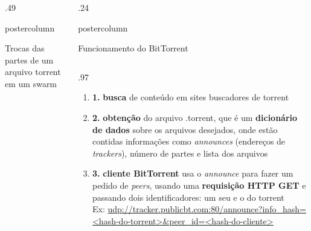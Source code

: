 \documentclass[final,brazil]{beamer}
\newenvironment{innercol}[3][.97\textwidth]{
\begin{columns}
  \hspace{#2}
  \begin{column}{#1}
    \vspace{#3}
    \justifying
}{
  \end{column}
\end{columns}
}
\newlength{\columnheight}
\begin{document}
\begin{frame}
\begin{columns}
\begin{column}{.49\textwidth}
\begin{beamercolorbox}[center,wd=\textwidth]{postercolumn}
\begin{minipage}[T]{.95\textwidth}
{\begin{block}{Trocas das partes de um arquivo torrent em um swarm}
\begin{innercol}[\textwidth]{-2ex}{0ex}
\begin{figure}[H]
\begin{subfigure}[H]{\myhsize}
                  \end{subfigure}%
                \end{figure}
              \end{innercol}
            \end{block}
          }
        \end{minipage}
      \end{beamercolorbox}
    \end{column}

    \begin{column}{.24\textwidth}
      \begin{beamercolorbox}[center,wd=\textwidth]{postercolumn}
        \begin{minipage}[T]{.95\textwidth}  %
          \parbox[t][\columnheight]{\textwidth}{ %

            \begin{block}{Funcionamento do BitTorrent}
              \begin{innercol}{-6ex}{-1.4ex}
                \begin{enumerate}
                  \justifying
                  \item \textbf{1.} \textbf{busca} de conteúdo em sites buscadores de
                  torrent

                  \item \textbf{2.} \textbf{obtenção} do arquivo .torrent, que é um
                    \textbf{dicionário de dados} sobre os arquivos desejados, onde estão
                    contidas informações como \emph{announces} (endereços de
                    \emph{trackers}), número de partes e lista dos arquivos

                  \item \textbf{3.} \textbf{cliente BitTorrent} usa o \emph{announce}
                    para fazer um pedido de \emph{peers}, usando uma \textbf{requisição HTTP GET} e passando dois identificadores: um seu e o do torrent \\
                    Ex: \url{udp://tracker.publicbt.com:80/announce?info_hash=<hash-do-torrent>&peer_id=<hash-do-cliente>}


\end{enumerate}
\end{innercol}
\end{block}}
\end{minipage}
\end{beamercolorbox}
\end{column}
\end{columns}
\end{frame}
\end{document}
